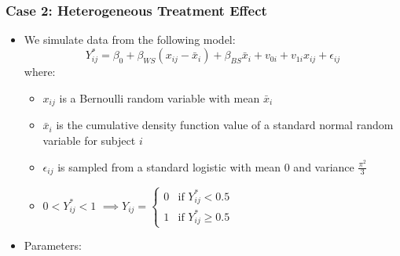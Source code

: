 \documentclass{article}
\begin{document}
        \subsubsection{Case 2: Heterogeneous Treatment Effect}
            \begin{itemize}
                \item We simulate data from the following model: $$Y_{ij}^* = \beta_0 + \beta_{WS}(x_{ij}-\bar{x}_i) + \beta_{BS}\bar{x}_i + v_{0i} + v_{1i}x_{ij} + \epsilon_{ij}$$
                where:
                    \begin{itemize}
                        \item $x_{ij}$ is a Bernoulli random variable with mean $\bar{x}_i$
                        \item $\bar{x}_i$ is the cumulative density function value of a standard normal random variable for subject $i$
                        \item $\epsilon_{ij}$ is sampled from a standard logistic with mean 0 and variance $\frac{\pi^2}{3}$
                        \item $ 0 < Y_{ij}^* < 1$   $\implies Y_{ij} = 
                            \begin{cases}
                                0 & \text{if } Y_{ij }^* < 0.5\\    
                                1 & \text{if } Y_{ij }^* \ge 0.5    
                            \end{cases}$
                    \end{itemize}
                \item Parameters:
\end{itemize}
\end{document}
